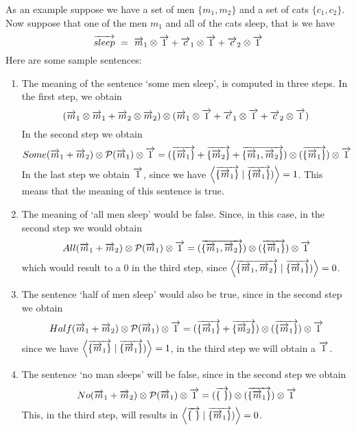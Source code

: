 As an example suppose we have  a set of men $\{m_1, m_2\}$ and a set of cats $\{c_1, c_2\}$. Now suppose that one of the men $m_1$ and all of the cats  sleep, that is we have
\[
\overrightarrow{sleep} \ = \  \overrightarrow{m}_1 \otimes \overrightarrow{1} + \overrightarrow{c}_1 \otimes \overrightarrow{1} + \overrightarrow{c}_2 \otimes \overrightarrow{1}
\]
Here are some sample sentences:
\begin{enumerate}
\item The meaning  of the sentence `some men sleep', is computed in three steps. In the first step, we obtain
\[
(\overrightarrow{m}_1 \otimes \overrightarrow{m}_1 + \overrightarrow{m}_2 \otimes \overrightarrow{m}_2)  \otimes ( \overrightarrow{m}_1 \otimes \overrightarrow{1} + \overrightarrow{c}_1 \otimes \overrightarrow{1} + \overrightarrow{c}_2 \otimes \overrightarrow{1})
\]
In the second step we obtain
\[
Some(\overrightarrow{m}_1 + \overrightarrow{m}_2) \otimes {\cal P}(\overrightarrow{m}_1) \otimes \overrightarrow{1} = 
(\overrightarrow{\{\overrightarrow{m}_1\}} + \overrightarrow{\{\overrightarrow{m}_2\}} + \overrightarrow{\{\overrightarrow{m}_1, \overrightarrow{m}_2\}}) \otimes (\overrightarrow{\{\overrightarrow{m}_1\}}) \otimes \overrightarrow{1}
 \]
In the last step we obtain $\overrightarrow{1}$, since we have $\left \langle \overrightarrow{\{\overrightarrow{m}_1\}} \mid \overrightarrow{\{\overrightarrow{m}_1\}}) \right \rangle = 1$. This  means that the meaning of this sentence is true.  
\item The meaning of `all men sleep' would be false. Since, in this case, in the second step we would obtain
\[
All(\overrightarrow{m}_1 + \overrightarrow{m}_2) \otimes {\cal P}(\overrightarrow{m}_1) \otimes \overrightarrow{1} = 
(\overrightarrow{\{\overrightarrow{m}_1, \overrightarrow{m}_2\}}) \otimes (\overrightarrow{\{\overrightarrow{m}_1\}}) \otimes \overrightarrow{1}
 \]
which would result to a 0 in the third step, since $\left \langle \overrightarrow{\{\overrightarrow{m}_1, \overrightarrow{m}_2\}} \mid \overrightarrow{\{\overrightarrow{m}_1\}}) \right \rangle = 0$.  
\item The sentence `half of  men sleep' would also be true, since in the second step we obtain
\[
Half(\overrightarrow{m}_1 + \overrightarrow{m}_2) \otimes {\cal P}(\overrightarrow{m}_1) \otimes \overrightarrow{1} = 
(\overrightarrow{\{\overrightarrow{m}_1\}} + \overrightarrow{\{\overrightarrow{m}_2\}}) \otimes (\overrightarrow{\{\overrightarrow{m}_1\}}) \otimes \overrightarrow{1}
 \]
since we  have $\left \langle \overrightarrow{\{\overrightarrow{m}_1\}} \mid \overrightarrow{\{\overrightarrow{m}_1\}}) \right \rangle = 1$, in the third step we will obtain a $\overrightarrow{1}$.  
\item The sentence `no man sleeps' will be false, since in the second step we obtain
\[
No(\overrightarrow{m}_1 + \overrightarrow{m}_2) \otimes {\cal P}(\overrightarrow{m}_1) \otimes \overrightarrow{1} = 
(\overrightarrow{\{ \ \}}) \otimes (\overrightarrow{\{\overrightarrow{m}_1\}}) \otimes \overrightarrow{1}
 \]
 This, in the third step,  will results in $\left \langle \overrightarrow{\{\ \}} \mid \overrightarrow{\{\overrightarrow{m}_1\}}) \right \rangle = 0$.
\end{enumerate}
